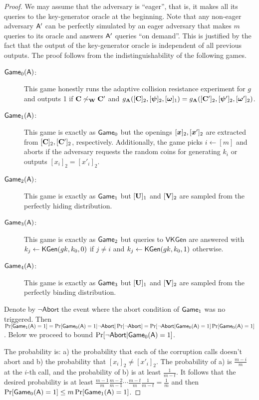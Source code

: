 \begin{proof}
We may assume that the adversary is ``eager'', that is, it makes all its queries to the key-generator oracle at the beginning. Note that any non-eager adversary $\mathsf{A}'$ can be perfectly simulated  by an eager adversary that makes $m$ queries to its oracle and answers $\mathsf{A}'$ queries ``on demand''. This is justified by the fact that the output of the key-generator oracle is independent of all previous outputs.
The proof follows from the indistinguishability of the following games.
\begin{description}
\item[$\mathsf{Game}_0(\mathsf{A})$:] This game honestly runs the adaptive collision resistance experiment for $g$ and outputs 1 if $\mathbf{{C}} \not\sim_{\mathbf{{W}}} \mathbf{{C}}'$ and $g_{\mathbf{{A}}}([\mathbf{{C}}]_2,[{\boldsymbol{\psi}}]_2,[{\boldsymbol{\omega}}]_1)=g_{\mathbf{{A}}}([\mathbf{{C}}']_2,[{\boldsymbol{\psi}}']_2,\allowbreak[{\boldsymbol{\omega}}']_2)$.
\item[$\mathsf{Game}_1(\mathsf{A})$:] This game is exactly as $\mathsf{Game}_0$ but the openings $[{\boldsymbol{x}}]_2,[{\boldsymbol{x}}']_2$ are extracted from $[\mathbf{{C}}]_2,[\mathbf{{C}}']_2$, respectively. Additionally, the game picks $i\gets[m]$ and aborts if the adversary requests the random coins for generating $k_i$ or outputs $[x_i]_2=[x'_i]_2$.
\item[$\mathsf{Game}_2(\mathsf{A})$:] This game is exactly as $\mathsf{Game}_1$ but $[\mathbf{{U}}]_1$ and $[\mathbf{{V}}]_2$ are sampled from the perfectly hiding distribution.
\item[$\mathsf{Game}_3(\mathsf{A})$:] This game is exactly as $\mathsf{Game}_2$ but queries to $\mathsf{VKGen}$ are answered with $k_j\gets\mathsf{KGen}(gk,k_0,0)$ if $j\neq i$ and $k_j\gets\mathsf{KGen}(gk,k_0,1)$ otherwise.
\item[$\mathsf{Game}_4(\mathsf{A})$:] This game is exactly as $\mathsf{Game}_3$ but $[\mathbf{{U}}]_1$ and $[\mathbf{{V}}]_2$ are sampled from the perfectly binding distribution.
\end{description}
Denote by $\neg\mathsf{Abort}$ the event where the abort condition of $\mathsf{Game}_1$ was no triggered. Then
$\Pr[\mathsf{Game}_1(\mathsf{A})=1] = \Pr[\mathsf{Game}_0(\mathsf{A})=1|\neg\mathsf{Abort}]\Pr[\neg\mathsf{Abort}]=\Pr[\neg\mathsf{Abort}|\allowbreak \mathsf{Game}_0(\mathsf{A})=1]\Pr[\mathsf{Game}_0(\mathsf{A})=1]$.
Below we proceed to bound $\Pr[\neg\mathsf{Abort}|\allowbreak\mathsf{Game}_0(\mathsf{A})=1]$.

The probability is: a) the probability that each of the corruption calls doesn't abort and b) the probability that $[x_i]_2\neq[x'_i]_2$. The probability of a) is $\frac{m-i}{m}$ at the $i$-th call, and the probability of b) is at least $\frac{1}{m-t}$. It follows that the desired probability is at least $\frac{m-1}{m}\frac{m-2}{m-1}\cdots\frac{m-t}{m}\frac{1}{m-t}=\frac{1}{m}$ and then $\Pr[\mathsf{Game}_0(\mathsf{A})=1]\leq m \Pr[\mathsf{Game}_1(\mathsf{A})=1]$.


\end{proof}

